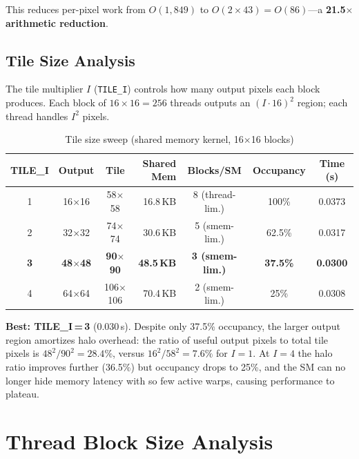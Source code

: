\documentclass[11pt]{article}
\begin{document}
This reduces per-pixel work from $O(1{,}849)$ to $O(2 \times 43) = O(86)$---a
\textbf{21.5$\times$ arithmetic reduction}.

\subsection{Tile Size Analysis}

The tile multiplier $I$ (\texttt{TILE\_I}) controls how many output pixels each block
produces. Each block of $16 \times 16 = 256$ threads outputs an $(I \cdot 16)^2$
region; each thread handles $I^2$ pixels.

\begin{table}[h]
\centering
\caption{Tile size sweep (shared memory kernel, 16$\times$16 blocks)}
\smallskip
\begin{tabular}{c c c r c c c}
\toprule
\textbf{TILE\_I} & \textbf{Output} & \textbf{Tile} & \textbf{Shared Mem} & \textbf{Blocks/SM} & \textbf{Occupancy} & \textbf{Time (s)} \\
\midrule
1 & 16$\times$16 & 58$\times$58   & 16.8\,KB & 8 (thread-lim.) & 100\%  & 0.0373 \\
2 & 32$\times$32 & 74$\times$74   & 30.6\,KB & 5 (smem-lim.)   & 62.5\% & 0.0317 \\
\rowcolor{green!15}
\textbf{3} & \textbf{48$\times$48} & \textbf{90$\times$90} & \textbf{48.5\,KB} & \textbf{3 (smem-lim.)} & \textbf{37.5\%} & \textbf{0.0300} \\
4 & 64$\times$64 & 106$\times$106 & 70.4\,KB & 2 (smem-lim.)   & 25\%   & 0.0308 \\
\bottomrule
\end{tabular}
\end{table}

\textbf{Best: TILE\_I\,=\,3} (0.030\,s). Despite only 37.5\% occupancy, the larger
output region amortizes halo overhead: the ratio of useful output pixels to total tile
pixels is $48^2/90^2 = 28.4\%$, versus $16^2/58^2 = 7.6\%$ for $I{=}1$. At $I{=}4$
the halo ratio improves further (36.5\%) but occupancy drops to 25\%, and the SM can
no longer hide memory latency with so few active warps, causing performance to plateau.

\section{Thread Block Size Analysis}
\end{document}
